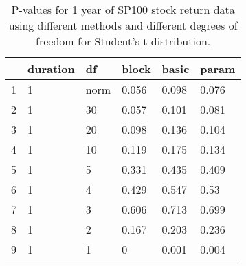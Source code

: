 \begin{table}[ht]
\centering
\caption{P-values for 1 year of SP100 stock return data using different 
  methods
  and different degrees of freedom for Student's t distribution.} 
\label{table:SP1001}
\begin{tabular}{rlllll}
  \hline
 & duration & df & block & basic & param \\ 
  \hline
1 & 1 & norm & 0.056 & 0.098 & 0.076 \\ 
  2 & 1 & 30 & 0.057 & 0.101 & 0.081 \\ 
  3 & 1 & 20 & 0.098 & 0.136 & 0.104 \\ 
  4 & 1 & 10 & 0.119 & 0.175 & 0.134 \\ 
  5 & 1 & 5 & 0.331 & 0.435 & 0.409 \\ 
  6 & 1 & 4 & 0.429 & 0.547 & 0.53 \\ 
  7 & 1 & 3 & 0.606 & 0.713 & 0.699 \\ 
  8 & 1 & 2 & 0.167 & 0.203 & 0.236 \\ 
  9 & 1 & 1 & 0 & 0.001 & 0.004 \\ 
   \hline
\end{tabular}
\end{table}

